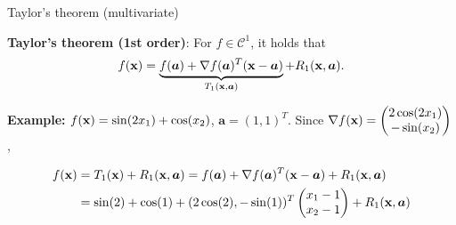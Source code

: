 \documentclass[11pt,compress,t,notes=noshow, xcolor=table]{beamer}
\begin{document}
\begin{vbframe}{Taylor's theorem (multivariate)}

\vspace{-\baselineskip}

\begin{kframe}
    \textbf{Taylor's theorem (1st order)}: For $f\in\mathcal{C}^1$, it holds that
    \begin{equation*}
        f(\mathbf{x}) = \underbrace{f(\bm{a}) + \nabla f(\bm{a})^T (\mathbf{x} - \bm{a})}_{T_1(\mathbf{x}, \bm{a})} + R_1(\mathbf{x},\bm{a}).
    \end{equation*}
\end{kframe}

\begin{footnotesize}
    \textbf{Example: } $f(\mathbf{x}) = \sin(2x_1) + \cos(x_2)$, $\bm{a} = (1, 1)^T$.
    Since $\nabla f(\mathbf{x}) = \begin{pmatrix}2\cos(2x_1) \\ -\sin(x_2)\end{pmatrix}$,

    \vspace{-0.7\baselineskip}
    
    \begin{align*}
        f(\mathbf{x}) &= T_1(\mathbf{x}) + R_1(\mathbf{x}, \bm{a}) = f(\bm{a}) + \nabla f(\bm{a})^T (\mathbf{x} - \bm{a}) + R_1(\mathbf{x}, \bm{a})\\
        &= \sin(2) + \cos(1) + (2 \cos(2), - \sin(1))^T\begin{pmatrix} x_1 - 1 \\ x_2 - 1\end{pmatrix} + R_1(\mathbf{x}, \bm{a})
    \end{align*}
\end{footnotesize}

\vspace*{-0.5\baselineskip}


\end{vbframe}
\end{document}
